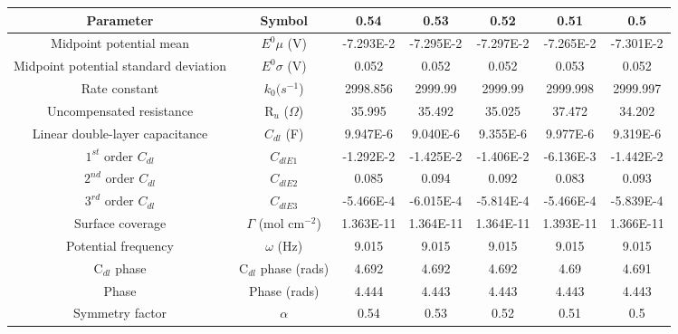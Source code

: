 \documentclass[preview]{standalone}
\begin{document}
\begin{center}
\begin{tabular}{|c|c|c|c|c|c|c|}
\hline
Parameter & Symbol& 0.54 & 0.53 & 0.52 & 0.51 & 0.5\\
\hline\hline
Midpoint potential mean & $E^0 \mu$ (V) & -7.293E-2 & -7.295E-2 & -7.297E-2 & -7.265E-2 & -7.301E-2 \\
\hline
Midpoint potential standard deviation & $E^0 \sigma$ (V) & 0.052 & 0.052 & 0.052 & 0.053 & 0.052 \\
\hline
Rate constant & $k_0 (s^{-1}$) & 2998.856 & 2999.99 & 2999.99 & 2999.998 & 2999.997 \\
\hline
Uncompensated resistance & R$_u$ ($\Omega$) & 35.995 & 35.492 & 35.025 & 37.472 & 34.202 \\
\hline
Linear double-layer capacitance & $C_{dl}$ (F) & 9.947E-6 & 9.040E-6 & 9.355E-6 & 9.977E-6 & 9.319E-6 \\
\hline
$1^{st}$ order $C_{dl}$ & $C_{dlE1}$& -1.292E-2 & -1.425E-2 & -1.406E-2 & -6.136E-3 & -1.442E-2 \\
\hline
$2^{nd}$ order $C_{dl}$ & $C_{dlE2}$& 0.085 & 0.094 & 0.092 & 0.083 & 0.093 \\
\hline
$3^{rd}$ order $C_{dl}$ & $C_{dlE3}$& -5.466E-4 & -6.015E-4 & -5.814E-4 & -5.466E-4 & -5.839E-4 \\
\hline
Surface coverage & $\Gamma$ (mol cm$^{-2}$) & 1.363E-11 & 1.364E-11 & 1.364E-11 & 1.393E-11 & 1.366E-11 \\
\hline
Potential frequency & $\omega$ (Hz) & 9.015 & 9.015 & 9.015 & 9.015 & 9.015 \\
\hline
C$_{dl}$ phase & C$_{dl}$ phase (rads) & 4.692 & 4.692 & 4.692 & 4.69 & 4.691 \\
\hline
Phase & Phase (rads) & 4.444 & 4.443 & 4.443 & 4.443 & 4.443 \\
\hline
Symmetry factor & $\alpha$& 0.54 & 0.53 & 0.52 & 0.51 & 0.5 \\
\hline
\end{tabular}
\end{center}
\end{document}
